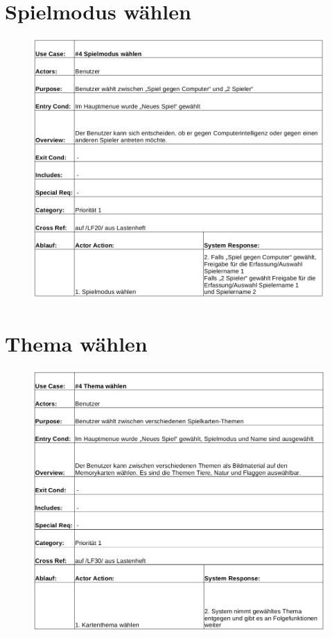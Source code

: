 \clearpage
\section{Spielmodus wählen}
\begin{figure}[!h]
	\centering
    \includegraphics[width=\textwidth]{./ucbSpielmodus.png}
	\label{}
\end{figure}

\clearpage
\section{Thema wählen}
\begin{figure}[!h]
	\centering
    \includegraphics[width=\textwidth]{./ucbThema.png}
	\label{}
\end{figure} 

